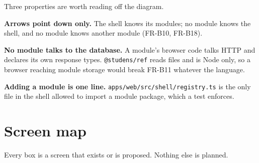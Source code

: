 \documentclass[11pt,a4paper]{article}
\begin{document}
\begin{center}
\end{center}

\begin{why}
Three properties are worth reading off the diagram.

\textbf{Arrows point down only.} The shell knows its modules; no module knows
the shell, and no module knows another module (FR-B10, FR-B18).

\textbf{No module talks to the database.} A module's browser code talks HTTP and
declares its own response types. \texttt{@studens/ref} reads files and is Node
only, so a browser reaching module storage would break FR-B11 whatever the
language.

\textbf{Adding a module is one line.} \texttt{apps/web/src/shell/registry.ts} is
the only file in the shell allowed to import a module package, which a test
enforces.
\end{why}


\newpage
\section{Screen map}

Every box is a screen that exists or is proposed. Nothing else is planned.
\end{document}

